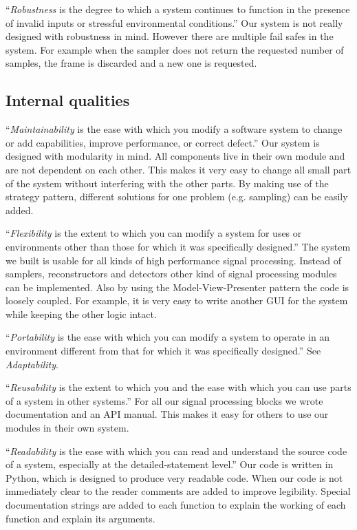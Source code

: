 \documentclass[a4paper, openany, oneside]{memoir}
\begin{document}
``\textit{Robustness} is the degree to which a system continues to function in the presence of invalid inputs or stressful environmental conditions.'' Our system is not really designed with robustness in mind. However there are multiple fail safes in the system. For example when the sampler does not return the requested number of samples, the frame is discarded and a new one is requested.

\subsection{Internal qualities}
``\textit{Maintainability} is the ease with which you modify a software system to change or add capabilities, improve performance, or correct defect.'' Our system is designed with modularity in mind. All components live in their own module and are not dependent on each other. This makes it very easy to change all small part of the system without interfering with the other parts. By making use of the strategy pattern, different solutions for one problem (e.g. sampling) can be easily added.

``\textit{Flexibility} is the extent to which you can modify a system for uses or environments other than those for which it was specifically designed.'' The system we built is usable for all kinds of high performance signal processing. Instead of samplers, reconstructors and detectors other kind of signal processing modules can be implemented. Also by using the Model-View-Presenter pattern the code is loosely coupled. For example, it is very easy to write another GUI for the system while keeping the other logic intact.

``\textit{Portability} is the ease with which you can modify a system to operate in an environment different from that for which it was specifically designed.'' See \textit{Adaptability}.

``\textit{Reusability} is the extent to which you and the ease with which you can use parts of a system in other systems.'' For all our signal processing blocks we wrote documentation and an API manual. This makes it easy for others to use our modules in their own system.

``\textit{Readability} is the ease with which you can read and understand the source code of a system, especially at the detailed-statement level.'' Our code is written in Python, which is designed to produce very readable code. When our code is not immediately clear to the reader comments are added to improve legibility. Special documentation strings are added to each function to explain the working of each function and explain its arguments.
\end{document}
